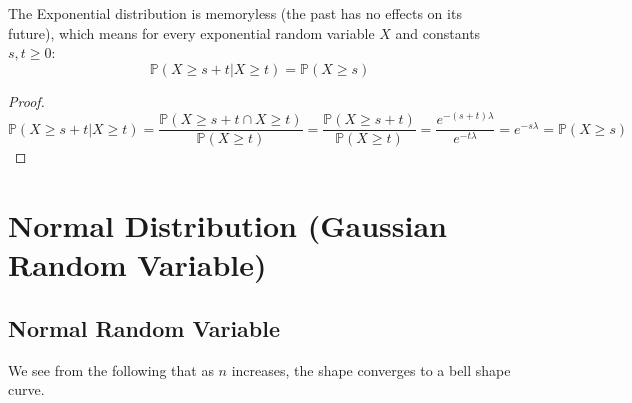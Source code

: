 The Exponential distribution is memoryless (the past has no effects on
its future), which means for every exponential random variable \(X\) and
constants \(s, t \geq 0\): 
\[
    \mathbb{P}(X \geq s + t \vert X \geq t) = \mathbb{P}(X \geq s)
\] 
\begin{proof}
    \[
        \mathbb{P}(X \geq s + t \vert X \geq t) = \dfrac{\mathbb{P}(X \geq s + t \cap X \geq t)}{\mathbb{P}(X \geq t)} = \dfrac{\mathbb{P}(X \geq s + t)}{\mathbb{P}(X \geq t)} = \dfrac{e^{-(s + t)\lambda}}{e^{-t\lambda}} = e^{-s\lambda} = \mathbb{P}(X \geq s)
    \]
\end{proof}

\newpage
\section{Normal Distribution (Gaussian Random Variable)}
\subsection{Normal Random Variable}
We see from the following that as \(n\) increases, the shape converges to a bell shape curve.

